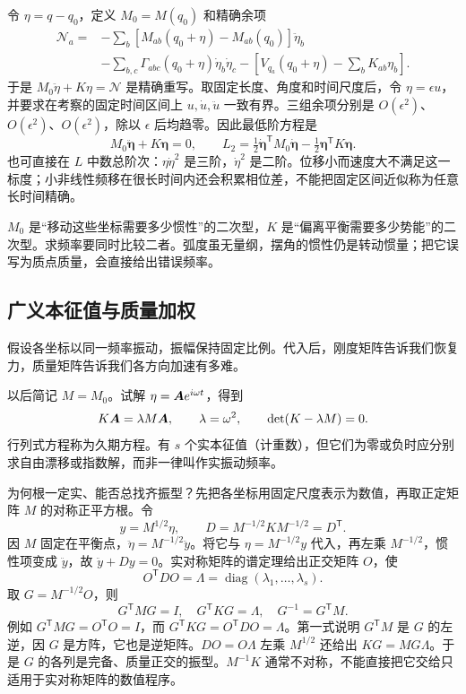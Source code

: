 令 $\eta=q-q_0$，定义 $M_0=M(q_0)$ 和精确余项
\begin{align*}
\mathcal N_a={}&-\sum_b[M_{ab}(q_0+\eta)-M_{ab}(q_0)]\ddot\eta_b\\
&-\sum_{b,c}\Gamma_{abc}(q_0+\eta)\dot\eta_b\dot\eta_c
-\left[V_{q_a}(q_0+\eta)-\sum_bK_{ab}\eta_b\right].
\end{align*}
于是 $M_0\ddot\eta+K\eta=\mathcal N$ 是精确重写。取固定长度、角度和时间尺度后，令 $\eta=\epsilon u$，并要求在考察的固定时间区间上 $u,\dot u,\ddot u$ 一致有界。三组余项分别是 $O(\epsilon^2)$、$O(\epsilon^2)$、$O(\epsilon^2)$，除以 $\epsilon$ 后均趋零。因此最低阶方程是
\begin{equation}
M_0\ddot{\boldsymbol\eta}+K\boldsymbol\eta=0,
\qquad
L_2=\tfrac12\dot{\boldsymbol\eta}^{\mathsf T}M_0\dot{\boldsymbol\eta}
-\tfrac12\boldsymbol\eta^{\mathsf T}K\boldsymbol\eta.
\label{eq:matrix-equation}
\end{equation}
也可直接在 $L$ 中数总阶次：$\eta\dot\eta^2$ 是三阶，$\dot\eta^2$ 是二阶。位移小而速度大不满足这一标度；小非线性频移在很长时间内还会积累相位差，不能把固定区间近似称为任意长时间精确。

\begin{physicsbox}
$M_0$ 是“移动这些坐标需要多少惯性”的二次型，$K$ 是“偏离平衡需要多少势能”的二次型。求频率要同时比较二者。弧度虽无量纲，摆角的惯性仍是转动惯量；把它误写为质点质量，会直接给出错误频率。
\end{physicsbox}

\subsection{广义本征值与质量加权}
假设各坐标以同一频率振动，振幅保持固定比例。代入后，刚度矩阵告诉我们恢复力，质量矩阵告诉我们各方向加速有多难。

以后简记 $M=M_0$。试解 $\eta=\boldsymbol{A} e^{i\omega t}$，得到
\begin{equation}
K\boldsymbol{A}=\lambda M\boldsymbol{A},\qquad \lambda=\omega^2,\qquad
\det(K-\lambda M)=0.
\label{eq:secular}
\end{equation}
行列式方程称为久期方程。有 $s$ 个实本征值（计重数），但它们为零或负时应分别求自由漂移或指数解，而非一律叫作实振动频率。

为何根一定实、能否总找齐振型？先把各坐标用固定尺度表示为数值，再取正定矩阵 $M$ 的对称正平方根。令
\[
y=M^{1/2}\eta,\qquad D=M^{-1/2}KM^{-1/2}=D^{\mathsf T}.
\]
因 $M$ 固定在平衡点，$\ddot\eta=M^{-1/2}\ddot y$。将它与 $\eta=M^{-1/2}y$ 代入，再左乘 $M^{-1/2}$，惯性项变成 $\ddot y$，故 $\ddot y+Dy=0$。实对称矩阵的谱定理给出正交矩阵 $O$，使
\[
O^{\mathsf T}DO=\Lambda=\operatorname{diag}(\lambda_1,\ldots,\lambda_s).
\]
取 $G=M^{-1/2}O$，则
\begin{equation}
G^{\mathsf T}MG=I,\quad G^{\mathsf T}KG=\Lambda,\quad
G^{-1}=G^{\mathsf T}M.
\label{eq:osc-simultaneous}
\end{equation}
例如 $G^{\mathsf T}MG=O^{\mathsf T}O=I$，而 $G^{\mathsf T}KG=O^{\mathsf T}DO=\Lambda$。第一式说明 $G^{\mathsf T}M$ 是 $G$ 的左逆，因 $G$ 是方阵，它也是逆矩阵。$DO=O\Lambda$ 左乘 $M^{1/2}$ 还给出 $KG=MG\Lambda$。于是 $G$ 的各列是完备、质量正交的振型。$M^{-1}K$ 通常不对称，不能直接把它交给只适用于实对称矩阵的数值程序。

